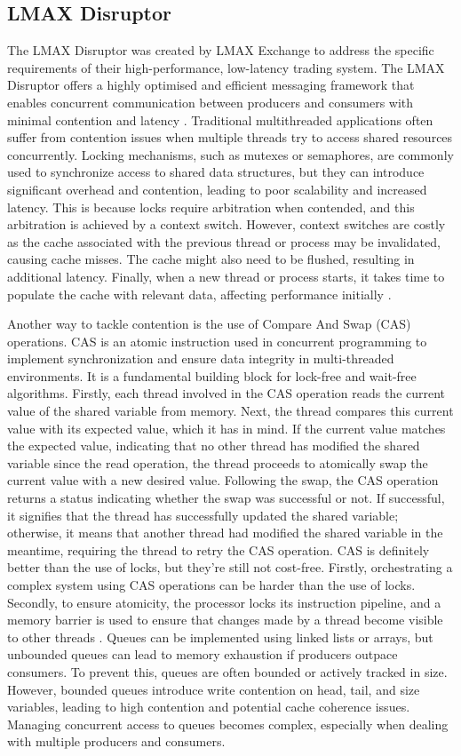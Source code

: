 \documentclass{article}
\theoremstyle{break}
\begin{document}
\subsection{LMAX Disruptor}
The LMAX Disruptor was created by LMAX Exchange to address the specific requirements of their high-performance, low-latency trading system. The LMAX Disruptor offers a highly optimised and efficient messaging framework that enables concurrent communication between producers and consumers with minimal contention and latency \cite{13}. Traditional multithreaded applications often suffer from contention issues when multiple threads try to access shared resources concurrently. Locking mechanisms, such as mutexes or semaphores, are commonly used to synchronize access to shared data structures, but they can introduce significant overhead and contention, leading to poor scalability and increased latency. This is because locks require arbitration when contended, and this arbitration is achieved by a context switch. However, context switches are costly as the cache associated with the previous thread or process may be invalidated, causing cache misses. The cache might also need to be flushed, resulting in additional latency. Finally, when a new thread or process starts, it takes time to populate the cache with relevant data, affecting performance initially \cite{13}.

Another way to tackle contention is the use of Compare And Swap (CAS) operations. CAS is an atomic instruction used in concurrent programming to implement synchronization and ensure data integrity in multi-threaded environments. It is a fundamental building block for lock-free and wait-free algorithms. Firstly, each thread involved in the CAS operation reads the current value of the shared variable from memory. Next, the thread compares this current value with its expected value, which it has in mind. If the current value matches the expected value, indicating that no other thread has modified the shared variable since the read operation, the thread proceeds to atomically swap the current value with a new desired value. Following the swap, the CAS operation returns a status indicating whether the swap was successful or not. If successful, it signifies that the thread has successfully updated the shared variable; otherwise, it means that another thread had modified the shared variable in the meantime, requiring the thread to retry the CAS operation. CAS is definitely better than the use of locks, but they're still not cost-free. Firstly, orchestrating a complex system using CAS operations can be harder than the use of locks. Secondly, to ensure atomicity, the processor locks its instruction pipeline, and a memory barrier is used to ensure that changes made by a thread become visible to other threads \cite{13}. Queues can be implemented using linked lists or arrays, but unbounded queues can lead to memory exhaustion if producers outpace consumers. To prevent this, queues are often bounded or actively tracked in size. However, bounded queues introduce write contention on head, tail, and size variables, leading to high contention and potential cache coherence issues. Managing concurrent access to queues becomes complex, especially when dealing with multiple producers and consumers.
\end{document}
